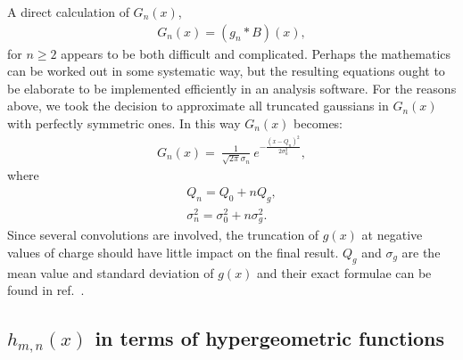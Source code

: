\documentclass[a4paper,11pt]{article}
\begin{document}
A direct calculation of $G_n(x)$, 
\begin{align}
G_n(x)  = (g_n*B)(x),
\end{align}   
for $n\geq 2$ appears to be both difficult and complicated. 
Perhaps the mathematics can be worked out in some systematic way, but the resulting equations ought to be elaborate to be implemented efficiently in an analysis software. 
For the reasons above, we took the decision to approximate all truncated gaussians in $G_n(x)$ with perfectly symmetric ones. 
In this way $G_n(x)$ becomes:
\begin{align}
G_n(x)  = \ \frac{1}{\sqrt{2\pi} \sigma_n } \ e^{ -\frac{ (x-Q_n)^2 }{2\sigma_n^2} },
\end{align}   
where
\begin{align}
Q_n  = Q_0 + n Q_g, \\
\sigma_n^2 = \sigma_0^2 + n \sigma_g^2.  
\end{align}   
Since several convolutions are involved, the truncation of $g(x)$ at negative values of charge should have little impact on the final result.  
$Q_g$ and $\sigma_g$ are the mean value and standard deviation of $g(x)$ and their exact formulae can be found in ref.~\cite{me}.


\subsection{$h_{m,n}(x)$ in terms of hypergeometric functions}
%
\end{document}
